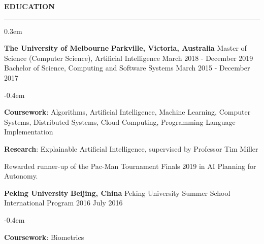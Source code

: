 \documentclass{cv}
\begin{document}
 \textbf{EDUCATION}
\sectionlineskip
\hrule
\begin{list}{}{\setlength{\leftmargin}{0em}}
\itemsep 0.3em
\item[]
    \textbf{The University of Melbourne} \hfill \textbf{Parkville, Victoria, Australia}%
    \vspace{0.1em} \newline
    {Master of Science (Computer Science), Artificial Intelligence} \hfill {March 2018 - December 2019}%
    \newline
    {Bachelor of Science, Computing and Software Systems} \hfill {March 2015 - December 2017}%
    \begin{list}{\raisebox{0.2em}{\tiny$\bullet$}}{\leftmargin=1.0em}
    \itemsep -0.4em \vspace{-0.4em}
        \item \textbf{Coursework}: Algorithms, Artificial Intelligence, Machine Learning, Computer Systems, Distributed Systems, Cloud Computing, Programming Language Implementation
        \item \textbf{Research}: Explainable Artificial Intelligence, supervised by Professor Tim Miller
        \item Rewarded runner-up of the Pac-Man Tournament Finals 2019 in AI Planning for Autonomy.
    \end{list}
\item[]
    \textbf{Peking University} \hfill \textbf{Beijing, China}%
    \vspace{0.1em} \newline 
    {Peking University Summer School International Program 2016} \hfill {July 2016}%
    \begin{list}{\raisebox{0.2em}{\tiny$\bullet$}}{\leftmargin=1.0em}
    \itemsep -0.4em \vspace{-0.4em}
        \item \textbf{Coursework}: Biometrics
    \end{list}
\end{list}

\end{document}
